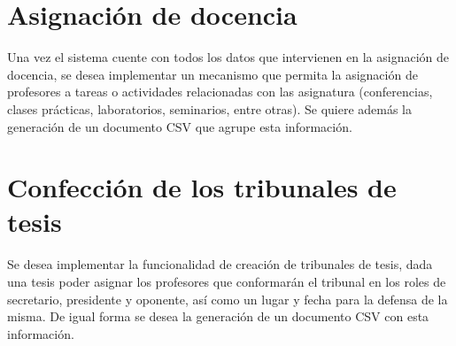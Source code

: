 \section{Asignación de docencia}
Una vez el sistema cuente con todos los datos que 
intervienen en la asignación de docencia, se desea 
implementar un mecanismo que permita la asignación
de profesores a tareas o actividades relacionadas
con las asignatura (conferencias, clases prácticas,
laboratorios, seminarios, entre otras).
Se quiere además la generación de un documento
CSV que agrupe esta información.


\section{Confección de los tribunales de tesis}
Se desea implementar la funcionalidad de creación
de tribunales de tesis, dada una tesis poder asignar
los profesores que conformarán el tribunal en los
roles de secretario, presidente y oponente, así como
un lugar y fecha para la defensa de la misma. De igual
forma se desea la generación de un documento CSV con
esta información.
